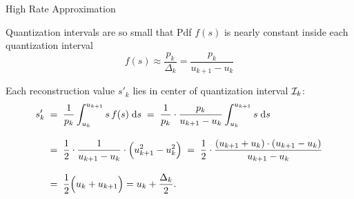 

\begin{frame}{High Rate Approximation}
\bit
\item[] Quantization intervals are so small that Pdf $f(s)$ is nearly constant inside each quantization interval
  $$
  f(s)\approx\frac{p_k}{\Delta_k}=\frac{p_k}{u_{k+1}-u_{k}}
  $$
\eit
{}
\bit
\item[]Each reconstruction value $s'_k$ lies in center of quantization interval ${\mathcal{I}}_k$:
  \begin{align*}
  s'_k
  &\;=\;\frac{1}{p_k}\int_{u_k}^{u_{k+1}}s\,f(s)\;\mathrm{d} s
  \;=\;\frac{1}{p_k}\cdot\frac{p_k}{u_{k+1}-u_k}\int_{u_k}^{u_{k+1}}s\;\mathrm{d} s\\[2ex]
  &\;=\;\frac{1}{2}\cdot\frac{1}{u_{k+1}-u_k}\cdot\Big(u^2_{k+1}-u^2_k\Big)
  \;=\;\frac{1}{2}\cdot\frac{(u_{k+1}+u_k)\cdot(u_{k+1}-u_k)}{u_{k+1}-u_k}\\[2ex]
  &\;=\;\frac{1}{2}\Big(u_k+u_{k+1}\Big)
  =u_k+\frac{\Delta_k}{2}.
  \end{align*}
  \eit
\end{frame}

